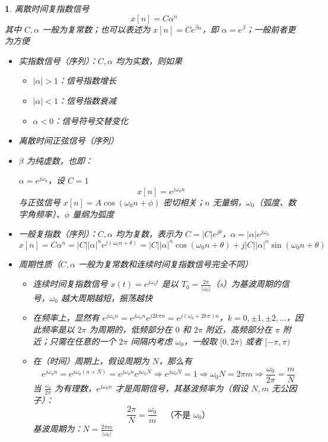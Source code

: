 \documentclass[UTF8]{report}
\theoremstyle{MyLineTheoremStyle} %
\theoremstyle{MyBlockTheoremStyle} %
\theoremstyle{MySubsubsectionStyle} %
\newtheorem{definition}{}
\begin{document}
\begin{definition}
    离散时间复指数信号
    \[
    x[n] = C\alpha^n
    \]
    其中 $C, \alpha$ 一般为复常数；也可以表述为 $x[n] = Ce^{\beta n}$，即 $\alpha = e^{\beta}$；一般前者更为方便
    \begin{itemize}
        \item 实指数信号（序列）：$C, \alpha$ 均为实数，则如果
        \begin{itemize}
            \item $|\alpha| > 1$：信号指数增长
            \item $|\alpha| < 1$：信号指数衰减
            \item $\alpha < 0$：信号符号交替变化
        \end{itemize}
        \item 离散时间正弦信号（序列）
        \item $\beta$ 为纯虚数，也即：\par
        $\alpha = e^{j\omega_0}$，设 $C = 1$
        \[
        x[n] = e^{j\omega_0 n}
        \]
        与正弦信号 $x[n] = A \cos(\omega_0 n + \phi)$ 密切相关；$n$ 无量纲，$\omega_0$（弧度、数字角频率）、$\phi$ 量纲为弧度

        \item 一般复指数（序列）：$C, \alpha$ 均为复数，表示为 $C = |C|e^{j\theta}$，$\alpha = |\alpha|e^{j\omega_0}$
        \[
        x[n] = C\alpha^n = |C| |\alpha|^n e^{j(\omega_0 n + \theta)} = |C| |\alpha|^n \cos(\omega_0 n + \theta) + j |C| |\alpha|^n \sin(\omega_0 n + \theta)
        \]

        \item 周期性质（$C, \alpha$ 一般为复常数和连续时间复指数信号完全不同）
        \begin{itemize}
            \item 连续时间复指数信号 $x(t) = e^{j\omega_0 t}$ 是以 $T_0 = \frac{2\pi}{|\omega_0|}$（s）为基波周期的信号，$\omega_0$ 越大周期越短，振荡越快
            \item 在频率上，显然有 $e^{j\omega_0 n} = e^{j\omega_0 n} e^{j2k\pi n} = e^{j(\omega_0 + 2k\pi)n}$，$k = 0, \pm1, \pm2, \ldots$，因此频率是以 $2\pi$ 为周期的，低频部分在 $0$ 和 $2\pi$ 附近，高频部分在 $\pi$ 附近；只需在任意的一个 $2\pi$ 间隔内考虑 $\omega_0$，一般取 $[0, 2\pi)$ 或者 $[-\pi, \pi)$
            \item 在（时间）周期上，假设周期为 $N$，那么有
            \[
            e^{j\omega_0 n} = e^{j\omega_0 (n+N)} = e^{j\omega_0 n} e^{j\omega_0 N} \Rightarrow e^{j\omega_0 N} = 1 \Rightarrow \omega_0 N = 2\pi m \Rightarrow \frac{\omega_0}{2\pi} = \frac{m}{N}
            \]
            当 $\frac{\omega_0}{2\pi}$ 为有理数，$e^{j\omega_0 n}$ 才是周期信号，其基波频率为（假设 $N, m$ 无公因子）：
            \[
            \frac{2\pi}{N} = \frac{\omega_0}{m} \quad \text{（不是 $\omega_0$）}
            \]
            基波周期为：$N = \frac{2\pi m}{|\omega_0|}$


\end{itemize}
\end{itemize}
\end{definition}
\end{document}
